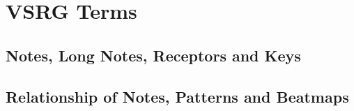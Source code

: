 \chapter{VSRG Terms}\label{ch:vsrg-terms}

\section{Notes, Long Notes, Receptors and Keys}\label{sec:notes-long-notes-receptors-and-keys}



\section{Relationship of Notes, Patterns and Beatmaps}\label{sec:relationship-of-notes-patterns-and-beatmaps}

